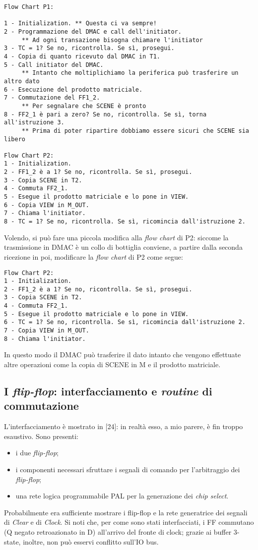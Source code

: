 \begin{verbatim}
Flow Chart P1:

1 - Initialization. ** Questa ci va sempre!
2 - Programmazione del DMAC e call dell'initiator. 
     ** Ad ogni transazione bisogna chiamare l'initiator
3 - TC = 1? Se no, ricontrolla. Se sì, prosegui.
4 - Copia di quanto ricevuto dal DMAC in T1.
5 - Call initiator del DMAC. 
     ** Intanto che moltiplichiamo la periferica può trasferire un altro dato
6 - Esecuzione del prodotto matriciale.
7 - Commutazione del FF1_2. 
     ** Per segnalare che SCENE è pronto
8 - FF2_1 è pari a zero? Se no, ricontrolla. Se sì, torna all'istruzione 3. 
     ** Prima di poter ripartire dobbiamo essere sicuri che SCENE sia libero

Flow Chart P2:
1 - Initialization.
2 - FF1_2 è a 1? Se no, ricontrolla. Se sì, prosegui.
3 - Copia SCENE in T2.
4 - Commuta FF2_1.
5 - Esegue il prodotto matriciale e lo pone in VIEW.
6 - Copia VIEW in M_OUT.
7 - Chiama l'initiator.
8 - TC = 1? Se no, ricontrolla. Se sì, ricomincia dall'istruzione 2.
\end{verbatim}

Volendo, si può fare una piccola modifica alla \textit{flow chart} di P2: siccome la trasmissione in DMAC è un collo di bottiglia conviene, a partire dalla seconda ricezione in poi, modificare la \textit{flow chart} di P2 come segue:

\begin{verbatim}
Flow Chart P2:
1 - Initialization.
2 - FF1_2 è a 1? Se no, ricontrolla. Se sì, prosegui.
3 - Copia SCENE in T2.
4 - Commuta FF2_1.
5 - Esegue il prodotto matriciale e lo pone in VIEW.
6 - TC = 1? Se no, ricontrolla. Se sì, ricomincia dall'istruzione 2.
7 - Copia VIEW in M_OUT.
8 - Chiama l'initiator.
\end{verbatim}
In questo modo il DMAC può trasferire il dato intanto che vengono effettuate altre operazioni come la copia di SCENE in M e il prodotto matriciale.

\subsection{I \textit{flip-flop}: interfacciamento e \textit{routine} di commutazione}

L'interfacciamento è mostrato in [24]: in realtà esso, a mio parere, è fin troppo esaustivo. Sono presenti:
\begin{itemize}
\item i due \textit{flip-flop};
\item i componenti necessari sfruttare i segnali di comando per l'arbitraggio dei \textit{flip-flop};
\item una rete logica programmabile PAL per la generazione dei \textit{chip select}.
\end{itemize}
Probabilmente era sufficiente mostrare i flip-flop e la rete generatrice dei segnali di \textit{Clear} e di \textit{Clock}. Si noti che, per come sono stati interfacciati, i FF commutano (Q negato retroazionato in D) all'arrivo del fronte di clock; grazie ai buffer 3-state, inoltre, non può esservi conflitto sull'IO bus.

